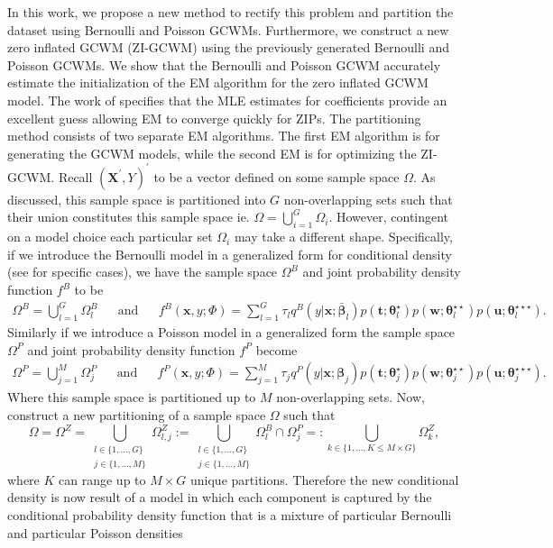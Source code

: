 \documentclass[11pt,letterpaper]{article}
\numberwithin{equation}{section}
\numberwithin{equation}{section}
\numberwithin{equation}{section}
\begin{document}
	In this work, we propose a new method to rectify this problem and partition the dataset using Bernoulli and Poisson GCWMs. Furthermore, we construct a new zero inflated GCWM (ZI-GCWM) using the previously generated Bernoulli and Poisson GCWMs. We show that the Bernoulli and Poisson GCWM accurately estimate the initialization of the EM algorithm for the zero inflated GCWM model. The work of \cite{Lambert} specifies that the MLE estimates for coefficients provide an excellent guess allowing EM to converge quickly for ZIPs. The partitioning method consists of two separate EM algorithms. The first EM algorithm is for generating the GCWM models, while the second EM is for optimizing the ZI-GCWM. Recall $(\bm {X^{'}}, Y)^{'}$ to be a vector defined on some sample space $\Omega$. As discussed, this sample space is partitioned into $G$ non-overlapping sets such that their union constitutes this sample space ie. $ \Omega = \bigcup_{i=1}^G \Omega_i $.  However, contingent on a model choice each particular set $\Omega_i$ may take a different shape.
	 Specifically, if we introduce the Bernoulli model in a generalized form for conditional density (see \cite{Ingrassia+Punzo+Vittadini+Minotti:2015} for specific cases), we have the sample space $\Omega^B$ and joint probability density function $f^B$ to be \begin{align*}
\Omega^B =  \bigcup_{l =1}^G \Omega_l^B & & \text{and} &  &
f^B(\bm x, y; \Phi)= \sum_{l=1}^{G} \tau_l q^B(y|\bm{x}; \bm{\bar{\beta}}_l) p(\bm{t};\bm{\theta}_l^{\star})p(\bm{w};\bm{\theta}_l^{\star\star})p(\bm{u};\bm{\theta}_l^{\star\star\star}).
\end{align*}
Similarly if we introduce a Poisson model in a generalized form the sample space $\Omega^P$ and joint probability density function $f^P$ become
\begin{align*}
\Omega^P =  \bigcup_{j =1}^M \Omega_j^P & & \text{and} &  &
f^P(\bm x, y; \Phi)= \sum_{j=1}^{M} \tau_j q^P(y|\bm{x};\bm{\beta}_{j}) p(\bm{t};\bm{\theta}_j^{\star})p(\bm{w};\bm{\theta}_j^{\star\star})p(\bm{u};\bm{\theta}_j^{\star\star\star}).
\end{align*}
Where this sample space is partitioned up to $M$ non-overlapping sets.
 Now, construct a new partitioning of a sample space $\Omega$ such that
$$\Omega =  \Omega^Z = \bigcup_{ \substack {l \in \{1 ,\ldots, G \} \\ j \in \{1 ,\ldots, M \}}  } \Omega_{l,j}^Z := \bigcup_{\substack{ l \in \{1 ,\ldots, G \} \\ j \in \{1 ,\ldots, M \}  } }  \Omega_l^B \cap \Omega_j^P =: \bigcup_{k \in \{1 ,\ldots, K\leq M \times G \}} \Omega_k^Z, $$ where $K$ can range up to $M \times G$ unique partitions. Therefore the new conditional density  is now result of a model in which each component is captured by the conditional probability density function that is a mixture of particular Bernoulli and particular Poisson densities
\end{document}
